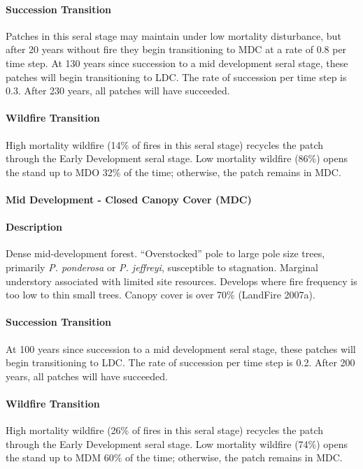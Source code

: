 \paragraph{Succession Transition} Patches in this seral stage may maintain under low mortality disturbance, but after 20 years without fire they begin transitioning to MDC at a rate of 0.8 per time step. At 130 years since succession to a mid development seral stage, these patches will begin transitioning to LDC. The rate of succession per time step is 0.3. After 230 years, all patches will have succeeded.

\paragraph{Wildfire Transition} High mortality wildfire (14\% of fires in this seral stage) recycles the patch through the Early Development seral stage. Low mortality wildfire (86\%) opens the stand up to MDO 32\% of the time; otherwise, the patch remains in MDC.

\noindent\hrulefill

\paragraph{Mid Development - Closed Canopy Cover (MDC)}

\paragraph{Description} Dense mid-development forest. ``Overstocked'' pole to large pole size trees, primarily \emph{P. ponderosa} or \emph{P. jeffreyi}, susceptible to stagnation. Marginal understory associated with limited site resources. Develops where fire frequency is too low to thin small trees. Canopy cover is over 70\% (LandFire 2007a).

\paragraph{Succession Transition} At 100 years since succession to a mid development seral stage, these patches will begin transitioning to LDC. The rate of succession per time step is 0.2. After 200 years, all patches will have succeeded.

\paragraph{Wildfire Transition} High mortality wildfire (26\% of fires in this seral stage) recycles the patch through the Early Development seral stage. Low mortality wildfire (74\%) opens the stand up to MDM 60\% of the time; otherwise, the patch remains in MDC.

